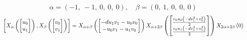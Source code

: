 \documentclass[11pt]{article}
\theoremstyle{definition}
\begin{document}
\[
\alpha = \left( -1, \  -1, \  0, \  0, \  0\right), \quad \beta = \left( 0, \  1, \  0, \  0, \  0\right)
\]
\[
\scaletoalign{\textwidth}{\left[ X_{\alpha}\left(\left[\begin{matrix}u_{0}\\u_{1}\end{matrix}\right]\right), X_{\beta}\left(\left[\begin{matrix}v_{0}\\v_{1}\end{matrix}\right]\right) \right] = X_{\alpha + \beta}\left(\left[\begin{matrix}- d u_{1} v_{1} - u_{0} v_{0}\\- u_{0} v_{1} - u_{1} v_{0}\end{matrix}\right]\right) X_{\alpha + 2\beta}\left(\left[\begin{matrix}\frac{c_{0} u_{0} \left(- d v_{1}^{2} + v_{0}^{2}\right)}{2}\\\frac{c_{0} u_{1} \left(- d v_{1}^{2} + v_{0}^{2}\right)}{2}\end{matrix}\right]\right) X_{2\alpha + 2\beta}\left(0\right)}
\]
\end{document}

